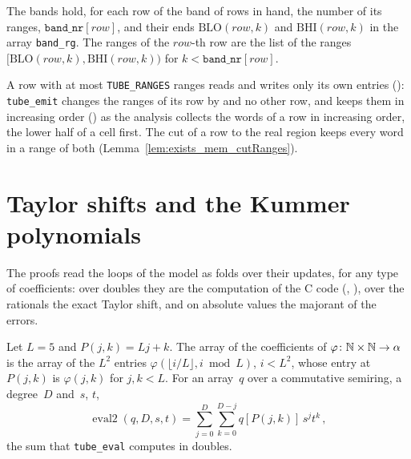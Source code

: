 \begin{definition}\label{def:TubeBands.rowRanges}
  \leanok
  The bands hold, for each row of the band of rows in hand, the number of its ranges,
  $\mathtt{band\_nr}[\mathit{row}]$, and their ends $\mathrm{BLO}(\mathit{row}, k)$ and
  $\mathrm{BHI}(\mathit{row}, k)$ in the array \texttt{band\_rg}. The ranges of the
  $\mathit{row}$-th row are the list of the ranges
  $[\mathrm{BLO}(\mathit{row}, k), \mathrm{BHI}(\mathit{row}, k))$ for
  $k < \mathtt{band\_nr}[\mathit{row}]$.
\end{definition}

A row with at most \texttt{TUBE\_RANGES} ranges reads and writes only its own entries
(): \texttt{tube\_emit} changes the ranges of its row by
 and no other row, and keeps them in increasing order
() as the analysis collects the words of a row in increasing
order, the lower half of a cell first. The cut of a row to the real region keeps every word in a
range of both (Lemma~\ref{lem:exists_mem_cutRanges}).

\section{Taylor shifts and the Kummer polynomials}\label{sec:tubeExact}

The proofs read the loops of the model as folds over their updates, for any type of coefficients:
over doubles they are the computation of the C code (,
), over the rationals the exact Taylor shift, and on absolute values the
majorant of the errors.

\begin{definition}\label{def:eval2}
  \leanok
  Let $L = 5$ and $P(j, k) = Lj + k$. The array of the coefficients of
  $\varphi \colon \mathbb{N} \times \mathbb{N} \to \alpha$ is the array of the $L^2$ entries
  $\varphi(\lfloor i/L \rfloor, i \bmod L)$, $i < L^2$, whose entry at $P(j, k)$ is $\varphi(j, k)$
  for $j, k < L$. For an array~$q$ over a commutative semiring, a degree~$D$ and~$s$, $t$,
  \[
    \operatorname{eval2}(q, D, s, t) = \sum_{j=0}^{D} \sum_{k=0}^{D-j} q[P(j, k)]\, s^j t^k\,,
  \]
  the sum that \texttt{tube\_eval} computes in doubles.
\end{definition}


